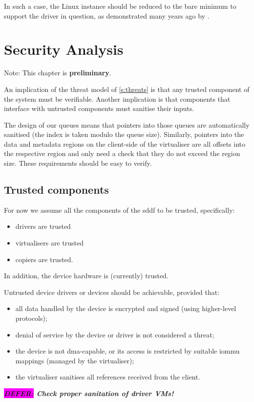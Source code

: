 \documentclass[a4paper,12pt]{report}
\newcommand{\DEFER}[1]{\textbf{\textsl{\colorbox{magenta}{DEFER:} #1}}}
\newcommand{\DEFER}[1]{\relax}
\begin{document}
In such a case, the Linux instance should be reduced to the bare
minimum to support the driver in question, as
demonstrated many years ago by \citet{LeVasseur_USG_04}.

\chapter{Security Analysis}\label{s:security}

Note: This chapter is \textbf{preliminary}.

An implication of the threat model of \autoref{s:threats} is that any
trusted component of the system must be verifiable. Another implication is
that components that interface with untrusted components must sanitise
their inputs.

The design of our queues means that
pointers into those queues are automatically sanitised (the index is
taken modulo the queue size). Similarly, pointers into the data and metadata
regions on the client-side of the virtualiser are all offsets into the
respective region and only need a check that they do not exceed the
region size. These requirements should be easy to verify.

\section{Trusted components}

For now we assume all the components of the \gls{sddf} to be trusted, specifically:
\begin{itemize}
\item drivers are trusted
\item virtualisers are trusted
\item copiers are trusted.
\end{itemize}
In addition, the device hardware is (currently) trusted.

Untrusted device drivers or devices should be achievable, provided that:
\begin{itemize}
\item all data handled by the device is encrypted and signed (using
  higher-level protocols);
\item denial of service by the device or driver is not considered a
  threat;
\item the device is not \gls{dma}-capable, or its access is restricted by
  suitable \gls{iommu} mappings (managed by the virtualiser);
\item the virtualiser sanitises all references received from the client.
\end{itemize}
\DEFER{Check proper sanitation of driver VMs!}
\end{document}
